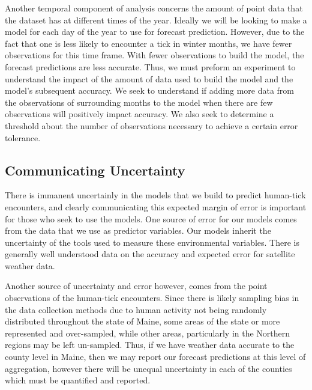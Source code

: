 \noindent Another temporal component of analysis concerns the amount of point data that the dataset has at different times of the year. Ideally we will be looking to make a model for each day of the year to use for forecast prediction. However, due to the fact that one is less likely to encounter a tick in winter months, we have fewer observations for this time frame. With fewer observations to build the model, the forecast predictions are less accurate.  Thus, we must preform an experiment to understand the impact of the amount of data used to build the model and the model's subsequent accuracy. We seek to understand if adding more data from the observations of surrounding months to the model when there are few observations will positively impact accuracy. We also seek to determine a threshold about the number of observations necessary to achieve a certain error tolerance. \newline

\subsection{Communicating Uncertainty}
There is immanent uncertainly in the models that we build to predict human-tick encounters, and clearly communicating this expected margin of error is important for those who seek to use the models. One source of error for our models comes from the data that we use as predictor variables. Our models inherit the uncertainty of the tools used to measure these environmental variables. There is generally well understood data on the accuracy and expected error for satellite weather data. \newline

\noindent Another source of uncertainty and error however, comes from the point observations of the human-tick encounters. Since there is likely sampling bias in the data collection methods due to human activity not being randomly distributed throughout the state of Maine, some areas of the state or more represented and over-sampled, while other areas, particularly in the Northern regions may be left un-sampled. Thus, if we have weather data accurate to the county level in Maine, then we may report our forecast predictions at this level of aggregation, however there will be unequal uncertainty in each of the counties which must be quantified and reported.




